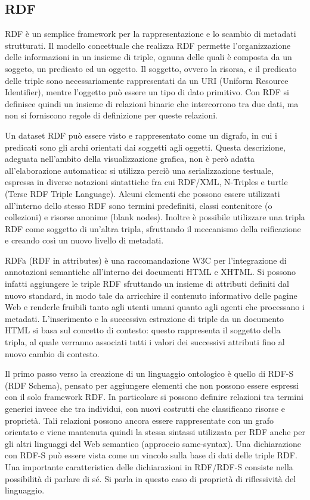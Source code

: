 \documentclass[Lau,binding=0.6cm,noexaminfo,oneside]{sapthesis}
\begin{document}
\subsection{RDF}
RDF è un semplice framework per la rappresentazione e lo scambio di metadati strutturati. Il modello concettuale che realizza RDF permette l'organizzazione delle informazioni in un insieme di triple, ognuna delle quali è composta da un soggeto, un predicato ed un oggetto. Il soggetto, ovvero la risorsa, e il predicato delle triple sono necessariamente rappresentati da un URI (Uniform Resource Identifier), mentre l'oggetto può essere un tipo di dato primitivo. Con RDF si definisce quindi un insieme di relazioni binarie che intercorrono tra due dati, ma non si forniscono regole di definizione per queste relazioni.\medskip

Un dataset RDF può essere visto e rappresentato come un digrafo, in cui i predicati sono gli archi orientati dai soggetti agli oggetti. Questa descrizione, adeguata nell'ambito della visualizzazione grafica, non è però adatta all'elaborazione automatica: si utilizza perciò una serializzazione testuale, espressa in diverse notazioni sintattiche fra cui RDF/XML, N-Triples e turtle (Terse RDF Triple Language).
Alcuni elementi che possono essere utilizzati all'interno dello stesso RDF sono termini predefiniti, classi contenitore (o collezioni) e risorse anonime (blank nodes). Inoltre è possibile utilizzare una tripla RDF come soggetto di un'altra tripla, sfruttando il meccanismo della reificazione e creando così un nuovo livello di metadati.\medskip

RDFa (RDF in attributes) è una raccomandazione W3C per l'integrazione di annotazioni semantiche all'interno dei documenti HTML e XHTML. Si possono infatti aggiungere le triple RDF sfruttando un insieme di attributi definiti dal nuovo standard, in modo tale da arricchire il contenuto informativo delle pagine Web e renderle fruibili tanto agli utenti umani quanto agli agenti che processano i metadati.
L'inserimento e la successiva estrazione di triple da un documento HTML si basa sul concetto di contesto: questo rappresenta il soggetto della tripla, al quale verranno associati tutti i valori dei successivi attributi fino al nuovo cambio di contesto.\medskip

Il primo passo verso la creazione di un linguaggio ontologico è quello di RDF-S (RDF Schema), pensato per aggiungere elementi che non possono essere espressi con il solo framework RDF. In particolare si possono definire relazioni tra termini generici invece che tra individui, con nuovi costrutti che classificano risorse e proprietà.
Tali relazioni possono ancora essere rappresentate con un grafo orientato e viene mantenuta quindi la stessa sintassi utilizzata per RDF anche per gli altri linguaggi del Web semantico (approccio same-syntax). Una dichiarazione con RDF-S può essere vista come un vincolo sulla base di dati delle triple RDF. Una importante caratteristica delle dichiarazioni in RDF/RDF-S consiste nella possibilità di parlare di sé. Si parla in questo caso di proprietà di riflessività del linguaggio.\medskip
\end{document}
